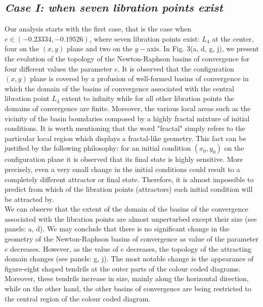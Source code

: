\documentclass[preprint,fleqn,5p,numbers,sort&compress]{elsarticle}
\begin{document}
\subsection{\emph{Case I: when seven libration points exist}}
\label{sec:401}
Our analysis starts with the first case, that is the case when $e\in (-0.23334, -0.19526)$, where seven libration points exist: $L_4$ at the center, four on the $(x, y)$ plane and two on the $y-$axis. In Fig. \textcolor[rgb]{1.00,0.00,0.50}{3}(a, d, g, j), we present the evolution of the topology of the Newton-Raphson basins of convergence for four different values the parameter $e$. It is observed that the configuration $(x, y)$ plane is covered by a profusion of well-formed basins of convergence in which the domain of the basins of convergence associated with the central libration point $L_4$ extent to infinity while for all other libration points the domains of convergence are finite. Moreover, the various local areas such as the vicinity of the basin boundaries composed by a highly fractal mixture of initial conditions. It is worth mentioning that the word "fractal" simply refers to the particular local region which displays a fractal-like geometry. This fact can be justified by the following philosophy: for an initial condition $(x_0, y_0)$ on the configuration plane it is observed that its final state is highly sensitive. More precisely, even a very small change in the initial conditions could result to a completely different attractor or final state. Therefore, it is almost impossible to predict from which of the libration points (attractors) each initial condition will be attracted by.\\
We can observe that the extent of the domain of the basins of the convergence associated with the libration points are almost unperturbed except their size (see panels: a, d). We may conclude that there is no significant change in the geometry of the Newton-Raphson basins of convergence as value of the parameter $e$ decreases. However, as the value of $e$ decreases, the topology of the attracting domain changes  (see panels: g, j). The most notable change is the appearance of figure-eight shaped tendrils at the outer parts of the colour coded diagrams. Moreover, these tendrils increase in size, mainly along the horizontal direction, while on the other hand, the other basins of convergence are being restricted to the central region of the colour coded diagram.\\
\end{document}

